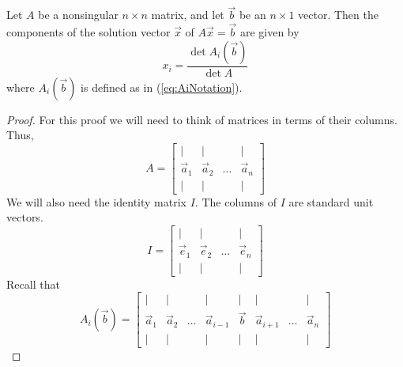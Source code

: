 \documentclass{ximera}
\begin{document}
\begin{theorem}\label{th:cramer}
Let $A$ be a nonsingular $n\times n$ matrix, and let $\vec{b}$ be an $n\times 1$ vector.  Then the components of the solution vector $\vec{x}$ of $A\vec{x}=\vec{b}$ are given by
$$x_i=\frac{\det{A_i(\vec{b})}}{\det{A}}$$
where $A_i(\vec{b})$ is defined as in (\ref{eq:AiNotation}).
\end{theorem}
\begin{proof}
For this proof we will need to think of matrices in terms of their columns.  Thus,
$$A=\begin{bmatrix}
           | & |& &|\\
		\vec{a}_1 & \vec{a}_2&\dots&\vec{a}_n\\
		| & |& &|
         \end{bmatrix}$$
We will also need the identity matrix $I$.  The columns of $I$ are standard unit vectors.
$$I=\begin{bmatrix}
           | & |& &|\\
		\vec{e}_1 & \vec{e}_2&\dots&\vec{e}_n\\
		| & |& &|
         \end{bmatrix}$$
Recall that 
$$A_i(\vec{b})=\begin{bmatrix}
           | & |& &|&|&|&&|\\
		\vec{a}_1 & \vec{a}_2&\dots &\vec{a}_{i-1}&\vec{b}&\vec{a}_{i+1}&\dots&\vec{a}_n\\
		| & |& &|&|&|&&|
         \end{bmatrix}$$
         

\end{proof}
\end{document}
